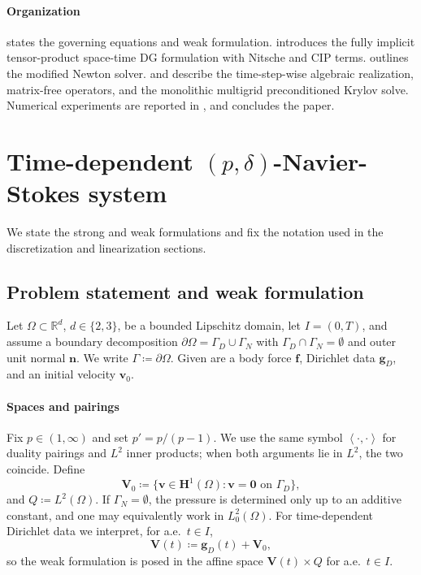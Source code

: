 \documentclass[DIV=16]{scrartcl}
\newcommand{\Ip}[2]{\left\langle #1,#2\right\rangle}
\newcommand{\uu}{\boldsymbol v}
\newcommand{\ff}{\boldsymbol f}
\newcommand{\nn}{\boldsymbol n}
\newcommand{\It}{I}
\newcommand{\GhD}{\Gamma_{D}}
\newcommand{\GhN}{\Gamma_N}
\newcommand{\Vv}{\boldsymbol{V}}
\newcommand{\Vvz}{\boldsymbol{V}_0}
\newcommand{\reg}{\delta}
\newcommand{\pn}{p}
\newcommand{\pnp}{\pn'}
\begin{document}
\paragraph{Organization}
 states the governing equations and weak formulation.
 introduces the fully implicit tensor-product
space-time DG formulation with Nitsche and CIP terms.
 outlines the modified Newton solver.
 and  describe the time-step-wise
algebraic realization, matrix-free operators, and the monolithic multigrid
preconditioned Krylov solve.
Numerical experiments are reported in , and
 concludes the paper.


\section{Time-dependent \texorpdfstring{$(\pn,\reg)$}{(p,delta)}-Navier-Stokes system}\label{sec:model}
We state the strong and weak formulations and fix the notation used in the
discretization and linearization sections.

\subsection{Problem statement and weak formulation}\label{sec:model:problem}
Let $\Omega\subset\mathbb{R}^d$, $d\in\{2,3\}$, be a bounded Lipschitz domain,
let $\It=(0,T)$, and assume a boundary decomposition
$\partial\Omega=\GhD\cup\GhN$ with $\GhD\cap\GhN=\emptyset$ and outer unit
normal $\nn$.
We write $\Gamma\coloneq\partial\Omega$.
Given are a body force $\ff$, Dirichlet data $\boldsymbol g_D$, and an initial
velocity $\uu_0$.

\paragraph{Spaces and pairings}
Fix $\pn\in(1,\infty)$ and set $\pnp=\pn/(\pn-1)$.
We use the same symbol $\Ip{\cdot}{\cdot}$ for duality pairings and $L^2$
inner products; when both arguments lie in $L^2$, the two coincide.
Define
\[
  \Vvz \coloneq \{ \uu\in \boldsymbol H^1(\Omega) : \uu=\boldsymbol 0 \text{ on }\GhD\},
\]
and $Q\coloneq L^2(\Omega)$. If $\GhN=\emptyset$, the pressure is determined
only up to an additive constant, and one may equivalently work in
$L^2_0(\Omega)$. For time-dependent Dirichlet data we interpret, for a.e.\
$t\in\It$,
\[
  \Vv(t)\coloneq \boldsymbol g_D(t)+\Vvz,
\]
so the weak formulation is posed in the affine space $\Vv(t)\times Q$ for
a.e.\ $t\in\It$.
\end{document}
